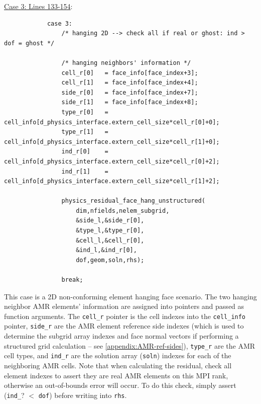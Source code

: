 \documentclass[11pt]{book}
\begin{document}
\noindent
\underline{Case 3: Lines 133-154}:
\begin{verbatim}
            case 3:
                /* hanging 2D --> check all if real or ghost: ind > dof = ghost */
                
                /* hanging neighbors' information */
                cell_r[0]   = face_info[face_index+3];
                cell_r[1]   = face_info[face_index+4];
                side_r[0]   = face_info[face_index+7];
                side_r[1]   = face_info[face_index+8];
                type_r[0]   = cell_info[d_physics_interface.extern_cell_size*cell_r[0]+0];
                type_r[1]   = cell_info[d_physics_interface.extern_cell_size*cell_r[1]+0];
                ind_r[0]    = cell_info[d_physics_interface.extern_cell_size*cell_r[0]+2];
                ind_r[1]    = cell_info[d_physics_interface.extern_cell_size*cell_r[1]+2];
                
                physics_residual_face_hang_unstructured(
                    dim,nfields,nelem_subgrid,
                    &side_l,&side_r[0],
                    &type_l,&type_r[0],
                    &cell_l,&cell_r[0],
                    &ind_l,&ind_r[0],
                    dof,geom,soln,rhs);
                
                break;
\end{verbatim}
This case is a 2D non-conforming element hanging face scenario. The two hanging neighbor AMR elements' information are assigned into pointers and passed as function arguments. The \texttt{cell\_r} pointer is the cell indexes into the \texttt{cell\_info} pointer, \texttt{side\_r} are the AMR element reference side indexes (which is used to determine the subgrid array indexes and face normal vectors if performing a structured grid calculation -- see \ref{appendix:AMR-ref-sides}), \texttt{type\_r} are the AMR cell types, and \texttt{ind\_r} are the solution array (\texttt{soln}) indexes for each of the neighboring AMR cells. Note that when calculating the residual, check all element indexes to assert they are real AMR elements on this MPI rank, otherwise an out-of-bounds error will occur. To do this check, simply assert (\texttt{ind\_}? $<$ \texttt{dof}) before writing into \texttt{rhs}.
\newpage
\end{document}
